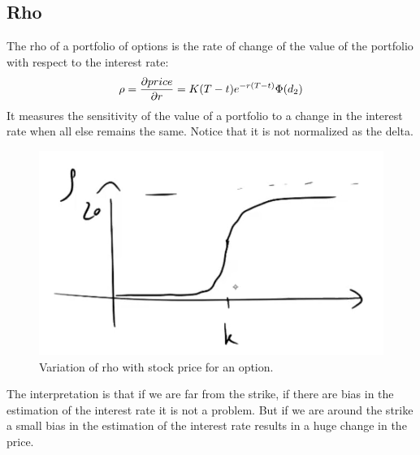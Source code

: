 \subsection{Rho}
The rho of a portfolio of options is the rate of change of the value of the portfolio with respect to the interest rate:
\begin{equation}
    \rho = \pdv{price}{r} = K(T-t)e^{-r(T-t)}\Phi(d_2)
\end{equation}
It measures the sensitivity of the value of a portfolio to a change in the interest rate when all else remains the same. Notice that it is not normalized as the delta.
\begin{figure}[htp]
    \centering
    \includegraphics[scale=0.3]{fig/tmp/fig15.png}
    \caption{Variation of rho with stock price for an option.}
    \label{fig:rho}
\end{figure}
\newline The interpretation is that if we are far from the strike, if there are bias in the estimation of the interest rate it is not a problem. But if we are around the strike a small bias in the estimation of the interest rate results in a huge change in the price.

